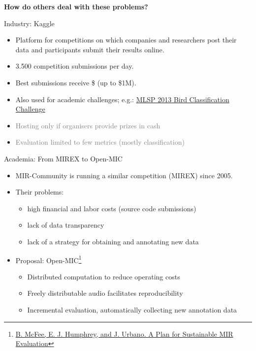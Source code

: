 \documentclass{beamer}
\begin{document}
\begin{frame}
\textbf{How do others deal with these problems?}
\end{frame}

\begin{frame}{Industry: Kaggle}

\begin{itemize}
\item Platform for competitions on which
companies and researchers post their data and participants submit their results online. 

\item 3.500 competition submissions per day. 
\item Best submissions receive \$ (up to \$1M). 
\item Also used for academic challenges; e.g.:
\href{https://www.kaggle.com/c/mlsp-2013-birds}{MLSP 2013 Bird
Classification Challenge}
\end{itemize}

\begin{itemize}
\item \textcolor{gray}{Hosting only if organisers provide prizes in cash}
\item \textcolor{gray}{Evaluation limited to few metrics (mostly classification)}
\end{itemize}

\end{frame}

\begin{frame}{Academia: From MIREX to Open-MIC}

\begin{itemize}
\item MIR-Community is running a similar competition (MIREX) since 2005. 
\item Their problems:
\begin{itemize}
  \item
    high financial and labor costs (source code submissions)
  \item
    lack of data transparency
  \item
    lack of a strategy for obtaining and annotating new data
\end{itemize}
\item Proposal: Open-MIC\footnote{\href{https://github.com/cosmir/open-mic}{B. McFee, E. J. Humphrey, and J. Urbano. A Plan for Sustainable MIR Evaluation}}
  \begin{itemize}
  \item
    Distributed computation to reduce operating costs
  \item
    Freely distributable audio facilitates reproducibility
  \item
    Incremental evaluation, automatically collecting new annotation data
  \end{itemize}
\end{itemize}
\end{frame}
\end{document}
